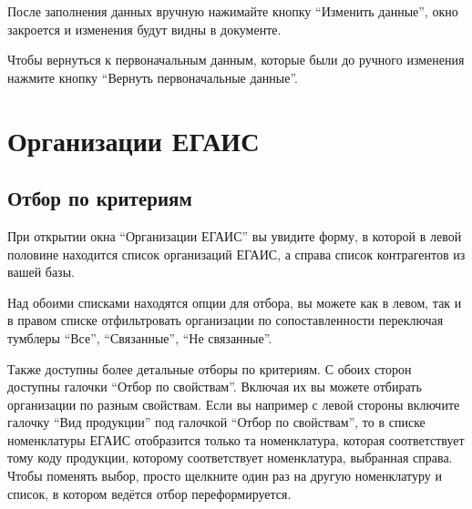 \documentclass[letterpaper,10pt,russian]{sphinxmanual}
\begin{document}
После заполнения данных вручную нажимайте кнопку ``Изменить данные'', окно закроется и изменения будут видны в документе.
\begin{figure}[htbp]
\centering

\noindent{}
\end{figure}
\begin{figure}[htbp]
\centering

\noindent{}
\end{figure}

Чтобы вернуться к первоначальным данным, которые были до ручного изменения нажмите кнопку ``Вернуть первоначальные данные''.
\begin{figure}[htbp]
\centering

\noindent{}
\end{figure}
\begin{figure}[htbp]
\centering

\noindent{}
\end{figure}


\chapter{Организации ЕГАИС}
\label{org::doc}\label{org:id1}

\section{Отбор по критериям}
\label{org:id2}
При открытии окна ``Организации ЕГАИС'' вы увидите форму, в которой в левой половине находится список организаций ЕГАИС, а справа список контрагентов из вашей базы.
\begin{figure}[htbp]
\centering

\noindent{}
\end{figure}

Над обоими списками находятся опции для отбора, вы можете как в левом, так и в правом списке отфильтровать организации по сопоставленности переключая тумблеры ``Все'', ``Связанные'', ``Не связанные''.

Также доступны более детальные отборы по критериям. С обоих сторон доступны галочки ``Отбор по свойствам''. Включая их вы можете отбирать организации по разным свойствам. Если вы например с левой стороны включите галочку ``Вид продукции'' под галочкой ``Отбор по свойствам'', то в списке номенклатуры ЕГАИС отобразится только та номенклатура, которая соответствует тому коду продукции, которому соответствует номенклатура, выбранная справа. Чтобы поменять выбор, просто щелкните один раз на другую номенклатуру и список, в котором ведётся отбор переформируется.
\begin{figure}[htbp]
\centering

\noindent{}
\end{figure}
\end{document}
